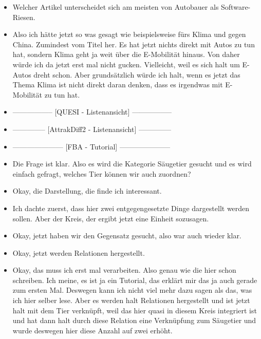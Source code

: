{\begin{itemize}[]
    Vielleicht aus dem Gefühl heraus \flqq Auto-Bloggerin nimmt Tesla-Modell auseinander\frqq{}. 
    Einfach, weil es da wahrscheinlich sehr viel um Software gehen wird und um den Autobauer an sich.
    \item {} Welcher Artikel unterscheidet sich am meisten von \flqq Autobauer als Software-Riesen\frqq{}.
    \item {} Also ich hätte jetzt so was gesagt wie beispielsweise \flqq fürs Klima und gegen China\frqq{}. 
    Zumindest vom Titel her.
    Es hat jetzt nichts direkt mit Autos zu tun hat, sondern Klima geht ja weit über die E-Mobilität hinaus.
    Von daher würde ich da jetzt erst mal nicht gucken. 
    Vielleicht, weil es sich halt um E-Autos dreht schon. 
    Aber grundsätzlich würde ich halt, wenn es jetzt das Thema Klima ist nicht direkt daran denken, dass es irgendwas mit E-Mobilität zu tun hat.
    \item {-----------------} [QUESI - Listenansicht] {-----------------}
    \item {--------------} [AttrakDiff2 - Listenansicht] {--------------}
    \item {---------------------} [FBA - Tutorial] {---------------------}
    \item {} Die Frage ist klar. 
    Also es wird die Kategorie Säugetier gesucht und es wird einfach gefragt, welches Tier können wir auch zuordnen?
    \item {} Okay, die Darstellung, die finde ich interessant.
    \item {} Ich dachte zuerst, dass hier zwei entgegengesetzte Dinge dargestellt werden sollen. Aber der Kreis, der ergibt jetzt eine Einheit sozusagen.
    \item {} Okay, jetzt haben wir den Gegensatz gesucht, also war auch wieder klar.
    \item {} Okay, jetzt werden Relationen hergestellt.
    \item {} Okay, das muss ich erst mal verarbeiten.
    Also genau wie die hier schon schreiben.
    Ich meine, es ist ja ein Tutorial, das erklärt mir das ja auch gerade zum ersten Mal.
    Deswegen kann ich nicht viel mehr dazu sagen als das, was ich hier selber lese.
    Aber es werden halt Relationen hergestellt und ist jetzt halt mit dem Tier verknüpft, weil das hier quasi in diesem Kreis integriert ist und hat dann halt durch diese Relation eine Verknüpfung zum Säugetier und wurde deswegen hier diese Anzahl auf zwei erhöht.

\end{itemize}}
